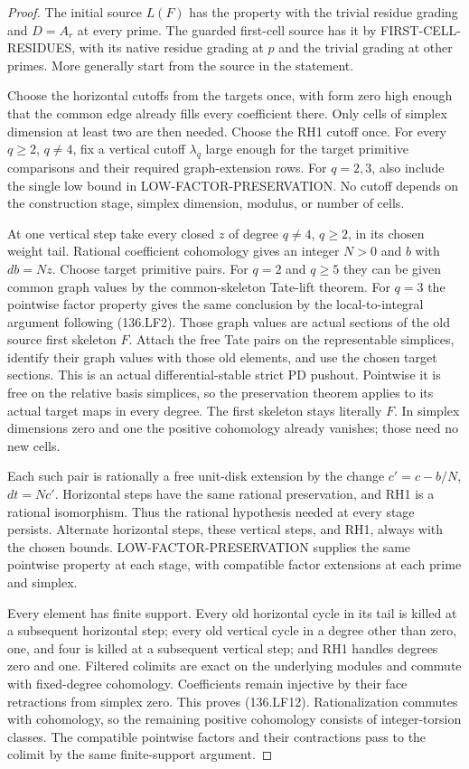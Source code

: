 \begin{proof}
The initial source \(L(F)\) has the property with the trivial
residue grading and \(D=A_r\) at every prime. The guarded
first-cell source has it by FIRST-CELL-RESIDUES, with its native
residue grading at \(p\) and the trivial grading at other
primes. More generally start from the source in the statement.

Choose the horizontal cutoffs from the targets once, with form
zero high enough that the common edge already fills every
coefficient there. Only cells of simplex dimension at least two
are then needed. Choose the RH1 cutoff once. For every
\(q\geq2\), \(q\ne4\), fix a vertical cutoff \(\lambda_q\)
large enough for the target primitive comparisons and their
required graph-extension rows. For \(q=2,3\), also include
the single low bound in LOW-FACTOR-PRESERVATION. No cutoff
depends on the construction stage, simplex dimension, modulus,
or number of cells.

At one vertical step take every closed \(z\) of degree
\(q\ne4\), \(q\geq2\), in its chosen weight tail.
Rational coefficient cohomology gives an integer \(N>0\)
and \(b\) with \(db=Nz\). Choose target primitive pairs.
For \(q=2\) and \(q\geq5\) they can be given common
graph values by the common-skeleton Tate-lift theorem. For
\(q=3\) the pointwise factor property gives the same conclusion
by the local-to-integral argument following (136.LF2). Those
graph values are actual sections of the old source first skeleton
\(F\). Attach the free Tate pairs on the representable simplices,
identify their graph values with those old elements, and use the
chosen target sections. This is an actual differential-stable
strict PD pushout. Pointwise it is free on the relative basis
simplices, so the preservation theorem applies to its actual
target maps in every degree. The first skeleton stays literally
\(F\). In simplex dimensions zero and one the positive
cohomology already vanishes; those need no new cells.

Each such pair is rationally a free unit-disk extension by the
change \(c'=c-b/N\), \(dt=Nc'\). Horizontal steps have
the same rational preservation, and RH1 is a rational isomorphism.
Thus the rational hypothesis needed at every stage persists.
Alternate horizontal steps, these vertical steps, and RH1, always
with the chosen bounds. LOW-FACTOR-PRESERVATION supplies the
same pointwise property at each stage, with compatible factor
extensions at each prime and simplex.

Every element has finite support. Every old horizontal cycle in
its tail is killed at a subsequent horizontal step; every old
vertical cycle in a degree other than zero, one, and four is
killed at a subsequent vertical step; and RH1 handles degrees
zero and one. Filtered colimits are exact on the underlying
modules and commute with fixed-degree cohomology. Coefficients
remain injective by their face retractions from simplex zero.
This proves (136.LF12). Rationalization commutes with cohomology,
so the remaining positive cohomology consists of integer-torsion
classes. The compatible pointwise factors and their contractions
pass to the colimit by the same finite-support argument.
\end{proof}

